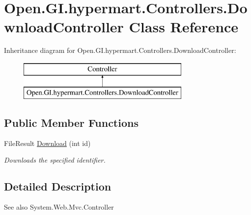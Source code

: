 \hypertarget{class_open_1_1_g_i_1_1hypermart_1_1_controllers_1_1_download_controller}{}\section{Open.\+G\+I.\+hypermart.\+Controllers.\+Download\+Controller Class Reference}
\label{class_open_1_1_g_i_1_1hypermart_1_1_controllers_1_1_download_controller}


 


Inheritance diagram for Open.\+G\+I.\+hypermart.\+Controllers.\+Download\+Controller\+:\begin{figure}[H]
\begin{center}
\leavevmode
\includegraphics[height=2.000000cm]{class_open_1_1_g_i_1_1hypermart_1_1_controllers_1_1_download_controller}
\end{center}
\end{figure}
\subsection*{Public Member Functions}
\begin{DoxyCompactItemize}
\item 
File\+Result \hyperlink{class_open_1_1_g_i_1_1hypermart_1_1_controllers_1_1_download_controller_a272d3e80defa78e91555596d44891c47}{Download} (int id)
\begin{DoxyCompactList}\small\item\em Downloads the specified identifier. \end{DoxyCompactList}\end{DoxyCompactItemize}


\subsection{Detailed Description}


\begin{DoxySeeAlso}{See also}
System.\+Web.\+Mvc.\+Controller


\end{DoxySeeAlso}


